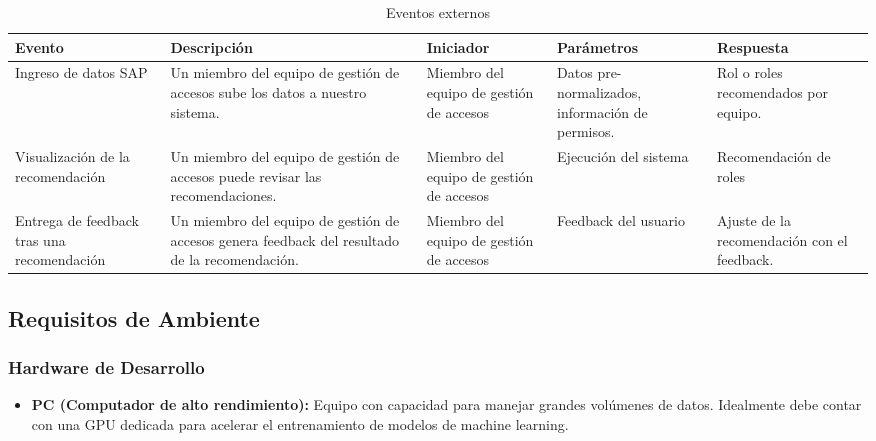 \documentclass[11pt,letterpaper]{article}
\begin{document}
\begin{table}[H]
\centering
\caption{Eventos externos}
\label{tab:E_externos}
\begin{tabular}{|>{\raggedright\arraybackslash}m{3cm}|
                >{\raggedright\arraybackslash}m{3cm}|
                >{\raggedright\arraybackslash}m{2cm}|
                >{\raggedright\arraybackslash}m{3cm}|
                >{\raggedright\arraybackslash}m{3cm}|}


    \hline
    Evento & Descripción & Iniciador &Parámetros &Respuesta \\
    \hline
    Ingreso de datos SAP      & Un miembro del equipo de gestión de accesos sube los datos a nuestro sistema. & Miembro del equipo de gestión de accesos & Datos pre-normalizados, información de permisos. & Rol o roles recomendados por equipo. \\
     \hline
    Visualización de la recomendación      & Un miembro del equipo de gestión de accesos puede revisar las recomendaciones. & Miembro del equipo de gestión de accesos & Ejecución del sistema & Recomendación de roles \\
     \hline
    Entrega de feedback tras una recomendación      & Un miembro del equipo de gestión de accesos genera feedback del resultado de la recomendación.  & Miembro del equipo de gestión de accesos & Feedback del usuario & Ajuste de la recomendación con el feedback. \\
     \hline
    
\end{tabular}
\end{table}

\subsection{Requisitos de Ambiente}\label{r2.4}

\subsubsection{Hardware de Desarrollo}
\begin{itemize}
    \item\textbf{PC (Computador de alto rendimiento):} Equipo con capacidad para manejar grandes volúmenes de datos. Idealmente debe contar con una GPU dedicada para acelerar el entrenamiento de modelos de machine learning.

\end{itemize}
\end{document}
